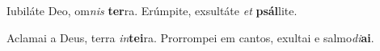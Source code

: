 \begin{greenumerate}
  \switchcolumn*


  \item Iubiláte Deo, om\textit{nis} \textbf{ter}ra.  {\GreStar} Erúmpite, exsultáte \textit{et} \textbf{psál}lite. 

  \switchcolumn%

  \item Aclamai a Deus, terra \textit{in}\textbf{tei}ra.  {\GreStar} Prorrompei em cantos, exultai e salmo\textit{di}\textbf{ai}. 
\end{greenumerate}